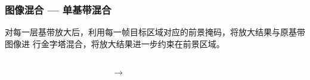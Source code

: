 \documentclass[xcolor=svgnames,serif,table,10pt]{beamer}
\begin{document}
\begin{frame}
  \frametitle{图像混合 --- 单基带混合}
  \small
  
  对每一层基带放大后，利用每一帧目标区域对应的前景掩码，将放大结果与原基带图像进
  行金字塔混合，将放大结果进一步约束在前景区域。
  
  \vspace{3em}

  \begin{columns}
    \begin{column}{.65\textwidth}
      \centering
      ~
      ~
    \end{column}

    \begin{column}{.1\textwidth}
      \centering
      \Huge $\rightarrow$
    \end{column}
    
    \begin{column}{.2\textwidth}
      \centering
    \end{column}
  \end{columns}

  \medskip
\end{frame}
\end{document}
